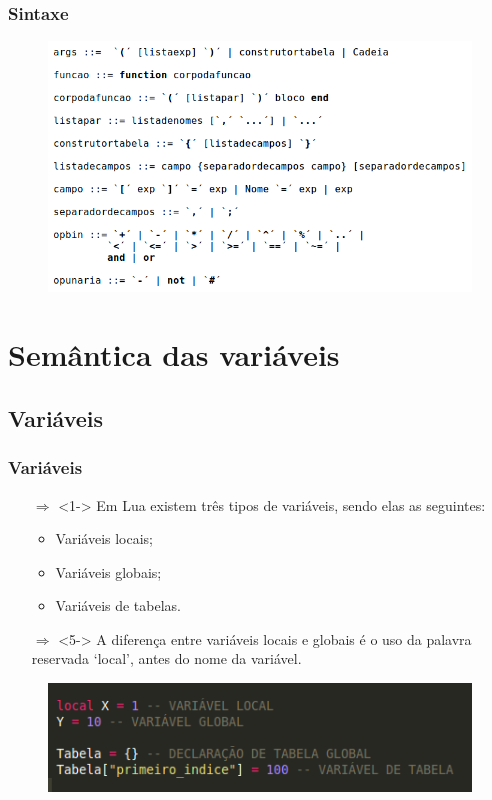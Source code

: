 ﻿\documentclass{beamer}
\begin{document}
\begin{frame}[fragile]
\frametitle{Sintaxe}
	\begin{figure}[!htb]
		\centering
		\includegraphics[width=1\linewidth]{imagens/sintaxe2}
	\end{figure}
\end{frame}

\section{Semântica das variáveis}
\subsection{Variáveis}
\begin{frame}[fragile]
\frametitle{Variáveis}
	\begin{itemize}
	\item [$\Rightarrow$]<1-> Em Lua existem três tipos de variáveis, sendo elas as seguintes:
	\begin{itemize}
		\item <2-> Variáveis locais;
		\item <3-> Variáveis globais;
		\item <4-> Variáveis de tabelas.
	\end{itemize}
	\item [$\Rightarrow$]<5-> A diferença entre variáveis locais e globais é o uso da palavra reservada ‘local’, antes do nome da variável.
	\end{itemize}
	\begin{figure}[!htb]
		\centering
		\includegraphics[width=0.7\linewidth]{imagens/variaveis}
	\end{figure}
\end{frame}
\end{document}
